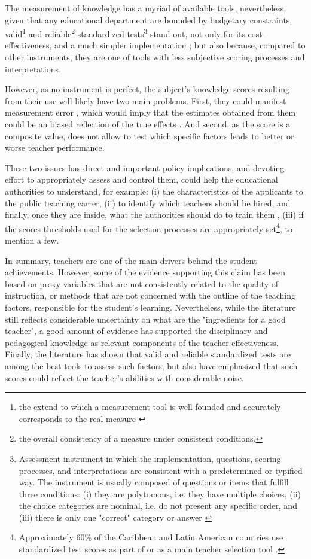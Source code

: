 The measurement of knowledge has a myriad of available tools, nevertheless, given that any educational department are bounded by budgetary constraints, valid\footnote{the extend to which a measurement tool is well-founded and accurately corresponds to the real measure \citep{Kelley_1927}} and reliable\footnote{the overall consistency of a measure under consistent conditions.} standardized tests\footnote{Assessment instrument in which the implementation, questions, scoring processes, and interpretations are consistent with a predetermined or typified way. The instrument is usually composed of questions or items that fulfill three conditions: (i) they are polytomous, i.e. they have multiple choices, (ii) the choice categories are nominal, i.e. do not present any specific order, and (iii) there is only one "correct" category or answer \citep{Rivera_2019}} stand out, not only for its cost-effectiveness, and a much simpler implementation \citep{Hincapie_et_al_2020}; but also because, compared to other instruments, they are one of tools with less subjective scoring processes and interpretations.

However, as no instrument is perfect, the subject's knowledge scores resulting  from their use will likely have two main problems. First, they could manifest measurement error \citep{Metzler_et_al_2012}, which would imply that the estimates obtained from them could be an biased reflection of the true effects \citep{Angrist_et_al_1999}. And second, as the score is a composite value, does not allow to test which specific factors leads to better or worse teacher performance.

These two issues has direct and important policy implications, and devoting effort to appropriately assess and control them, could help the educational authorities to understand, for example: (i) the characteristics of the applicants to the public teaching carrer, (ii) to identify which teachers should be hired, and finally, once they are inside, what the authorities should do to train them \citep{Hanushek_et_al_2012}, (iii) if the scores thresholds used for the selection processes are appropriately set\footnote{Approximately 60\% of the Caribbean and Latin American countries use standardized test scores as part of or as a main teacher selection tool \citep{Hincapie_et_al_2020}.}, to mention a few.



In summary, teachers are one of the main drivers behind the student achievements. However, some of the evidence supporting this claim has been based on proxy variables that are not consistently related to the quality of instruction, or methods that are not concerned with the outline of the teaching factors, responsible for the student's learning. Nevertheless, while the literature still reflects considerable uncertainty on what are the "ingredients for a good teacher", a good amount of evidence has supported the disciplinary and pedagogical knowledge as relevant components of the teacher effectiveness. Finally, the literature has shown that valid and reliable standardized tests are among the best tools to assess such factors, but also have emphasized that such scores could reflect the teacher's abilities with considerable noise.

